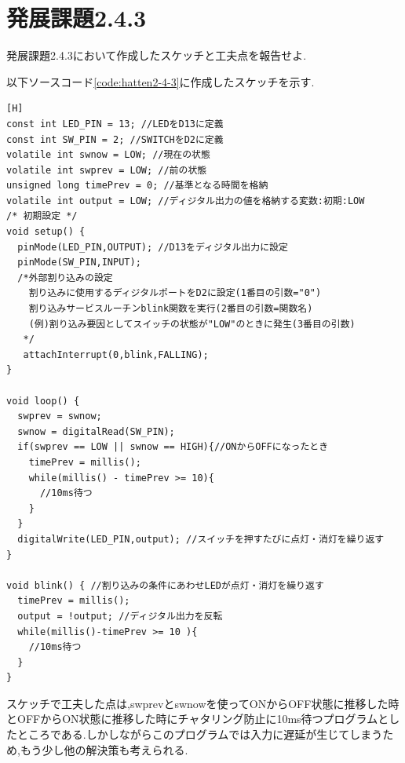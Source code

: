\documentclass{jarticle}
\begin{document}
\section{発展課題2.4.3}
発展課題2.4.3において作成したスケッチと工夫点を報告せよ.

以下ソースコード\ref{code:hatten2-4-3}に作成したスケッチを示す.

\begin{lstlisting}[caption = 発展課題2.4.3,label=code:hatten2-4-3][H]
const int LED_PIN = 13; //LEDをD13に定義
const int SW_PIN = 2; //SWITCHをD2に定義
volatile int swnow = LOW; //現在の状態
volatile int swprev = LOW; //前の状態
unsigned long timePrev = 0; //基準となる時間を格納
volatile int output = LOW; //ディジタル出力の値を格納する変数:初期:LOW
/* 初期設定 */
void setup() {
  pinMode(LED_PIN,OUTPUT); //D13をディジタル出力に設定
  pinMode(SW_PIN,INPUT);
  /*外部割り込みの設定
    割り込みに使用するディジタルポートをD2に設定(1番目の引数="0")
    割り込みサービスルーチンblink関数を実行(2番目の引数=関数名)
    (例)割り込み要因としてスイッチの状態が"LOW"のときに発生(3番目の引数)
   */
   attachInterrupt(0,blink,FALLING);
}

void loop() {
  swprev = swnow;
  swnow = digitalRead(SW_PIN);
  if(swprev == LOW || swnow == HIGH){//ONからOFFになったとき
    timePrev = millis();
    while(millis() - timePrev >= 10){
      //10ms待つ
    }
  }
  digitalWrite(LED_PIN,output); //スイッチを押すたびに点灯・消灯を繰り返す
}

void blink() { //割り込みの条件にあわせLEDが点灯・消灯を繰り返す
  timePrev = millis();
  output = !output; //ディジタル出力を反転
  while(millis()-timePrev >= 10 ){
    //10ms待つ
  }
}
\end{lstlisting}

スケッチで工夫した点は,swprevとswnowを使ってONからOFF状態に推移した時とOFFからON状態に推移した時にチャタリング防止に10ms待つプログラムとしたところである.しかしながらこのプログラムでは入力に遅延が生じてしまうため,もう少し他の解決策も考えられる.
\end{document}

